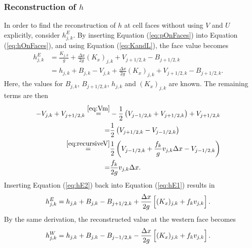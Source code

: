 \documentclass[11pt, a4paper]{article}
\newcommand{\dx}[0]{\Delta x}
\newcommand{\eref}[1]{Equation (\ref{eq:#1})}
\begin{document}
\subsubsection{Reconstruction of $h$}
In order to find the reconstruction of $h$ at cell faces without using $V$ and $U$ explicitly, consider $h_{j,k}^E$.
By inserting \eref{pOnFaces} into \eref{hOnFaces}, and using \eref{KandL}, the face value becomes
\begin{equation}
	\begin{split}
	h_{j,k}^E  &= \frac{K_{j,k}}{g} + \frac{\dx}{2g}(K_x)_{j,k} + V_{j+1/2,k} - B_{j+1/2,k} \\
			&= h_{j,k} + B_{j,k} - V_{j,k} + \frac{\dx}{2g}(K_x)_{j,k} + V_{j+1/2,k} - B_{j+1/2,k}.
	\label{eq:hE1}
	\end{split}
\end{equation}
Here, the values for $B_{j,k}$, $B_{j+1/2,k}$, $h_{j,k}$ and $(K_x)_{j,k}$ are known.
The remaining terms are then
\begin{equation}
	\begin{split}
	-V_{j,k} + V_{j+1/2,k} 	\overset{\eqref{eq:Vm}}{=}& -\frac{1}{2}\left(V_{j-1/2,k} + V_{j+1/2,k} \right) + V_{j+1/2,k} \\
						=& \frac{1}{2}\left( V_{j+1/2,k} - V_{j-1/2,k} \right) \\
						\overset{\eqref{eq:recursiveV}}{=}& \frac{1}{2}\left(  V_{j-1/2,k}  + \frac{f_k}{g}v_{j,k}\dx - V_{j-1/2,k} \right) \\
						=& \frac{f_k}{2g}v_{j,k}\dx.
	\end{split}
	\label{eq:hE2}
\end{equation}
Inserting \eref{hE2} back into \eref{hE1} results in 
\begin{equation}
	h_{j,k}^E = h_{j,k} + B_{j,k} - B_{j+1/2,k} + \frac{\dx}{2g}\left[ (K_x)_{j,k} + f_k v_{j,k} \vphantom{f^{2^2}}\right].
	\label{eq:hE}
\end{equation}
By the same derivation, the reconstructed value at the western face becomes
\begin{equation}
	h_{j,k}^W = h_{j,k} + B_{j,k} - B_{j-1/2,k} - \frac{\dx}{2g}\left[ (K_x)_{j,k} + f_k v_{j,k} \vphantom{f^{2^2}}\right].
	\label{eq:hW}
\end{equation}
\end{document}

